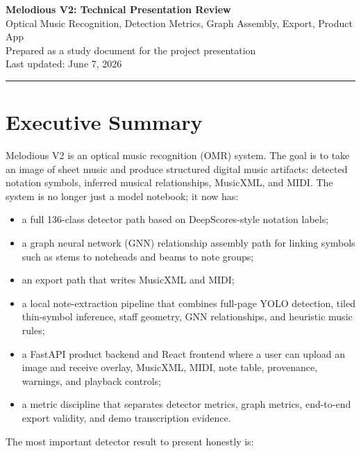 \documentclass[11pt]{article}
\newcommand{\project}{Melodious V2}
\begin{document}
\begin{center}
  {\Huge \textbf{\project: Technical Presentation Review}}\\[0.4em]
  {\Large Optical Music Recognition, Detection Metrics, Graph Assembly, Export, Product App}\\[0.6em]
  {\large Prepared as a study document for the project presentation}\\[0.4em]
  {\large Last updated: June 7, 2026}
\end{center}

\vspace{0.5em}
\hrule
\vspace{1em}

\tableofcontents
\newpage

\section{Executive Summary}

\project{} is an optical music recognition (OMR) system. The goal is to take an image of sheet music and produce structured digital music artifacts: detected notation symbols, inferred musical relationships, MusicXML, and MIDI. The system is no longer just a model notebook; it now has:

\begin{itemize}
  \item a full 136-class detector path based on DeepScores-style notation labels;
  \item a graph neural network (GNN) relationship assembly path for linking symbols such as stems to noteheads and beams to note groups;
  \item an export path that writes MusicXML and MIDI;
  \item a local note-extraction pipeline that combines full-page YOLO detection, tiled thin-symbol inference, staff geometry, GNN relationships, and heuristic music rules;
  \item a FastAPI product backend and React frontend where a user can upload an image and receive overlay, MusicXML, MIDI, note table, provenance, warnings, and playback controls;
  \item a metric discipline that separates detector metrics, graph metrics, end-to-end export validity, and demo transcription evidence.
\end{itemize}

The most important detector result to present honestly is:
\end{document}
